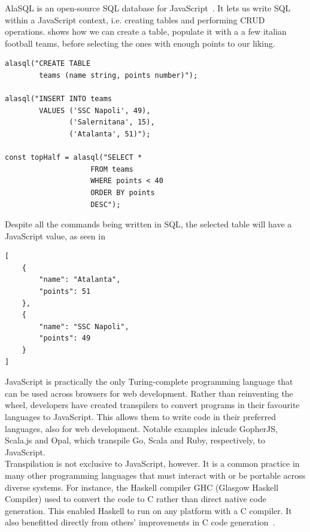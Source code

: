 AlaSQL is an open-source SQL database for JavaScript~\cite{alaSQL}. It lets us write SQL within a JavaScript context, i.e. creating tables and performing CRUD operations.  shows how we can create a table, populate it with a a few italian football teams, before selecting the ones with enough points to our liking. \\

\begin{lstlisting}[caption={JavaScript code to create, populate and select a table with AlaSQL.}, captionpos=b, label={JavaScript AlaSQL.}]
alasql("CREATE TABLE
        teams (name string, points number)");

alasql("INSERT INTO teams
        VALUES ('SSC Napoli', 49),
               ('Salernitana', 15),
               ('Atalanta', 51)");

const topHalf = alasql("SELECT *
                    FROM teams
                    WHERE points < 40
                    ORDER BY points
                    DESC");
\end{lstlisting}

Despite all the commands being written in SQL, the selected table will have a JavaScript value, as seen in  \\

\begin{lstlisting}[caption={The value of topHalf from \Cref{JavaScript AlaSQL.}}, captionpos=b, label={The value of topHalf}]
[
    {
        "name": "Atalanta",
        "points": 51
    },
    {
        "name": "SSC Napoli",
        "points": 49
    }
]
\end{lstlisting}

JavaScript is practically the only Turing-complete programming language that can be used across browsers for web development. Rather than reinventing the wheel, developers have created transpilers to convert programs in their favourite languages to JavaScript. This allows them to write code in their preferred languages, also for web development. Notable examples inlcude GopherJS, Scala.js and Opal, which transpile Go, Scala and Ruby, respectively, to JavaScript. \\

Transpilation is not exclusive to JavaScript, however. It is a common practice in many other programming languages that must interact with or be portable across diverse systems. For instance, the Haskell compiler GHC (Glasgow Haskell Compiler) used to convert the code to C rather than direct native code generation. This enabled Haskell to run on any platform with a C compiler. It also benefitted directly from others' improvements in C code generation~\cite{HaskellToC}. \\

